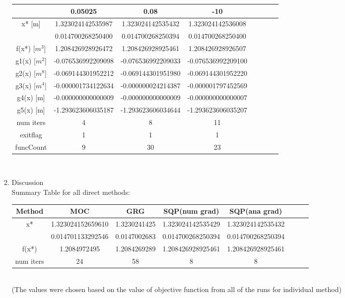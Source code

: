 \documentclass[12pt]{article}
\begin{document}
\begin{enumerate}[I]
\begin{enumerate}[1)]
\begin{tabular}{|c|c|c|c|c|c|c|c|}
	&0.05025&   0.08 & -10\\
\hline	
x* [m]&	 1.323024142535987&	1.323024142535432 &    1.323024142536008  \\
	& 0.014700268250400 &	0.014700268250394 &    0.014700268250400   \\
\hline
f(x*) [$m^3$]&	1.208426928926472 & 1.208426928925461&   1.208426928926507  \\
\hline
g1(x) [$m^2$]&	-0.076536992209098 &	-0.076536992209033 & -0.076536992209100      \\
g2(x) [$m^8$]	&-0.069144301952212&	-0.069144301951980 &    -0.069144301952220   \\
g3(x) [$m^4$]&	-0.000001734122634&	-0.000000024214387 & -0.000001797452569  \\
g4(x) [m]	&-0.000000000000009 &	-0.000000000000009 &   -0.000000000000007    \\
g5(x) [m]	& -1.293623606035187 &	-1.293623606034644 &    -1.293623606035207   \\
\hline
num iters & 4 &	8 & 11\\
\hline
exitflag &1 &1	&1\\
\hline
funcCount &9 &30 & 23\\
\hline
\end{tabular}\\

\newpage
\item Discussion\\  

Summary Table for all direct methods:\\
\begin{tabular}{|c|c|c|c|c|c|c|c|}
\hline 
Method &	MOC &	GRG & SQP(num grad) &SQP(ana grad) \\
\hline	
\textit{\color{blue}{best}} x* &	 1.323024152659610&	1.3230241425 & 1.323024142535429  & 1.323024142535432  \\
	& 0.014701133292546 &0.0147002683	&  0.014700268250394   & 0.014700268250394  \\
\hline
\textit{\color{blue}{best} }f(x*) &	1.2084972495 & 1.2084269289 &  1.208426928925461  & 1.208426928925461\\
\hline
num iters &24  &58	 & 8  &8 \\
\hline
\end{tabular}\\
(The \textit{\color{blue}{best}} values were chosen based on the value of objective function from all of the runs for individual method)\\


\end{enumerate}
\end{enumerate}
\end{document}
